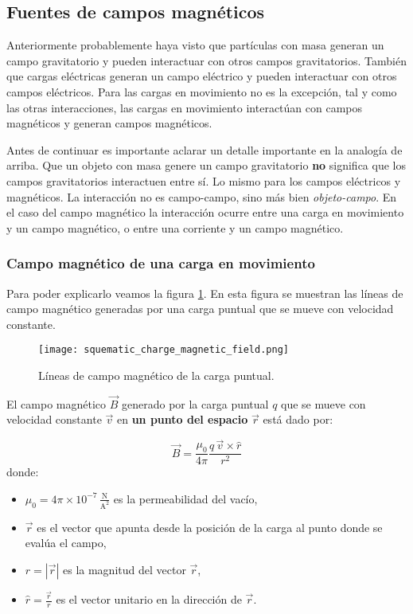 \subsection{Fuentes de campos magnéticos}

Anteriormente probablemente haya visto que partículas con masa generan un campo gravitatorio y pueden interactuar con otros campos gravitatorios. También que cargas eléctricas generan un campo eléctrico y pueden interactuar con otros campos eléctricos. Para las cargas en movimiento no es la excepción, tal y como las otras interacciones, las cargas en movimiento interactúan con campos magnéticos y generan campos magnéticos.

Antes de continuar es importante aclarar un detalle importante en la analogía de arriba. Que un objeto con masa genere un campo gravitatorio \textbf{no} significa que los campos gravitatorios interactuen entre sí. Lo mismo para los campos eléctricos y magnéticos. La interacción no es campo-campo, sino más bien \textit{objeto-campo}. En el caso del campo magnético la interacción ocurre entre una carga en movimiento y un campo magnético, o entre una corriente y un campo magnético.

\subsubsection{Campo magnético de una carga en movimiento}

Para poder explicarlo veamos la figura \ref{fig:lineas_de_campo_magnético_de_la_carga_puntual}. En esta figura se muestran las líneas de campo magnético generadas por una carga puntual que se mueve con velocidad constante.

\begin{figure}[ht]
  \centering
  \texttt{[image: squematic\_charge\_magnetic\_field.png]}
  \caption{Líneas de campo magnético de la carga puntual.}
  \label{fig:lineas_de_campo_magnético_de_la_carga_puntual}
\end{figure}

El campo magnético \(\vec{B}\) generado por la carga puntual \(q\) que se mueve con velocidad constante \(\vec{v}\) en \textbf{un punto del espacio} \(\vec{r}\) está dado por:

\begin{equation}
  \vec{B} = \frac{\mu_0}{4\pi} \frac{q \, \vec{v} \times \hat{r}}{r^2}
  \label{eq:campo_magnético_de_una_carga_puntual}
\end{equation}
donde:
\begin{itemize}
  \item \(\mu_0 = 4 \pi \times 10^{-7} \, \frac{\si{\newton}}{\si{\ampere\squared}}\) es la permeabilidad del vacío,
  \item \(\vec{r}\) es el vector que apunta desde la posición de la carga al punto donde se evalúa el campo,
  \item \(r = |\vec{r}|\) es la magnitud del vector \(\vec{r}\),
  \item \(\hat{r} = \frac{\vec{r}}{r}\) es el vector unitario en la dirección de \(\vec{r}\).
\end{itemize}


